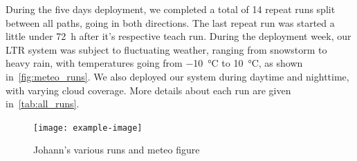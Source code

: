 During the five days deployment, we completed a total of 14 repeat runs split between all paths, going in both directions.
The last repeat run was started a little under \SI{72}{h} after it's respective teach run. 
During the deployment week, our \ac{LTR} system was subject to fluctuating weather, ranging from snowstorm to heavy rain, with temperatures going from \SI{-10}{\celsius} to \SI{10}{\celsius}, as shown in~\autoref{fig:meteo_runs}.
We also deployed our system during daytime and nighttime, with varying cloud coverage.
More details about each run are given in~\autoref{tab:all_runs}.

\begin{figure} [htpb]
	\centering
	\texttt{[image: example-image]}
	\caption{Johann's various runs and meteo figure}
	\label{fig:meteo_runs}
\end{figure}

